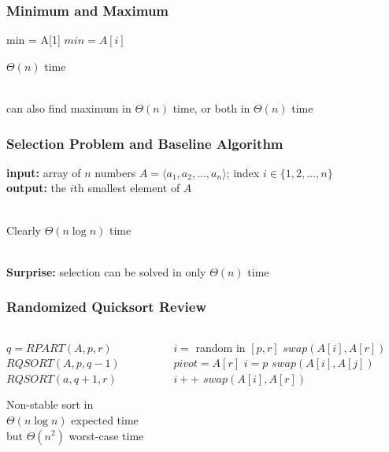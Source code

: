 \documentclass{beamer}
\newcommand{\stanza}{ \\~\ }
\begin{document}
\begin{frame} \frametitle{Minimum and Maximum}
  \begin{algorithmic}[1]
    \State min = A[1]
        \State $min = A[i]$
      \EndIf
    \EndFor
    \State {}
    \EndFunction
  \end{algorithmic}
  \vspace{.5cm}

  $\Theta(n)$ time \stanza

  can also find maximum in $\Theta(n)$ time, or both in $\Theta(n)$ time
\end{frame}

\begin{frame} \frametitle{Selection Problem and Baseline Algorithm}
\textbf{input:} array of $n$ numbers $A=\langle a_1, a_2, \ldots, a_n \rangle$;
  index $i \in \{1, 2, \ldots, n\}$\\
\textbf{output:} the $i$th smallest element of $A$ \stanza

\begin{algorithmic}[1]
  \State {}
  \EndFunction
\end{algorithmic}
\vspace{.5cm}
Clearly $\Theta(n \log n)$ time \stanza

\textbf{Surprise:} selection can be solved in only $\Theta(n)$ time
\end{frame}

\begin{frame} \frametitle{Randomized Quicksort Review}
\begin{columns}
\begin{column}{0.5\textwidth}
  \begin{algorithmic}[1]
      \State $q = RPART(A, p, r)$
      \State $RQSORT(A, p, q-1)$
      \State $RQSORT(a, q+1, r)$
    \EndIf
    \EndFunction
  \end{algorithmic}
  \vspace{.5cm}
  Non-stable sort in $\Theta(n \log n)$ expected time but
  $\Theta(n^2)$ worst-case time
\end{column}
\begin{column}{0.5\textwidth}
  \begin{algorithmic}[1]
    \State $i = $ random in $[p, r]$
    \State $swap(A[i], A[r])$
    \State $pivot = A[r]$
    \State $i = p$
        \State $swap(A[i], A[j])$
        \State $i++$
      \EndIf
    \EndFor
    \State $swap(A[i], A[r])$
    \State {}
    \EndFunction
  \end{algorithmic}
\end{column}
\end{columns}
\end{frame}
\end{document}
